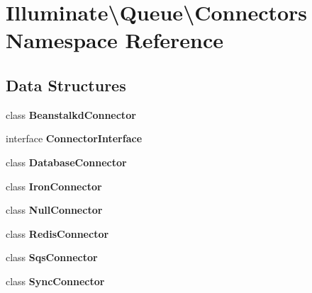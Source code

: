 \section{Illuminate\textbackslash{}Queue\textbackslash{}Connectors Namespace Reference}
\label{namespace_illuminate_1_1_queue_1_1_connectors}
\subsection*{Data Structures}
\begin{DoxyCompactItemize}
\item 
class {\bf Beanstalkd\+Connector}
\item 
interface {\bf Connector\+Interface}
\item 
class {\bf Database\+Connector}
\item 
class {\bf Iron\+Connector}
\item 
class {\bf Null\+Connector}
\item 
class {\bf Redis\+Connector}
\item 
class {\bf Sqs\+Connector}
\item 
class {\bf Sync\+Connector}
\end{DoxyCompactItemize}
